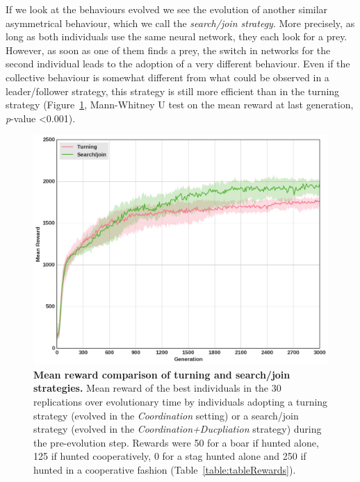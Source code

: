    If we look at the behaviours evolved we see the evolution of another similar asymmetrical behaviour, which we call the \emph{search/join strategy}. More precisely, as long as both individuals use the same neural network, they each look for a prey. However, as soon as one of them finds a prey, the switch in networks for the second individual leads to the adoption of a very different behaviour. Even if the collective behaviour is somewhat different from what could be observed in a leader/follower strategy, this strategy is still more efficient than in the turning strategy (Figure~\ref{fig:fitnessRecyclingComNN}, Mann-Whitney U test on the mean reward at last generation, {\em p}-value \textless 0.001).

    \begin{figure}[h]
      \centering
        \includegraphics[width=0.7\linewidth]{fig/ArticleBio2/Fig8.png}
        \caption{\textbf{Mean reward comparison of turning and search/join strategies.}
        Mean reward of the best individuals in the $30$ replications over evolutionary time by individuals adopting a turning strategy (evolved in the \emph{Coordination} setting) or a search/join strategy (evolved in the \emph{Coordination+Ducpliation} strategy) during the pre-evolution step. Rewards were 50 for a boar if hunted alone, 125 if hunted cooperatively, 0 for a stag hunted alone and 250 if hunted in a cooperative fashion (Table~\ref{table:tableRewards}).}
      \label{fig:fitnessRecyclingComNN}
    \end{figure} 


